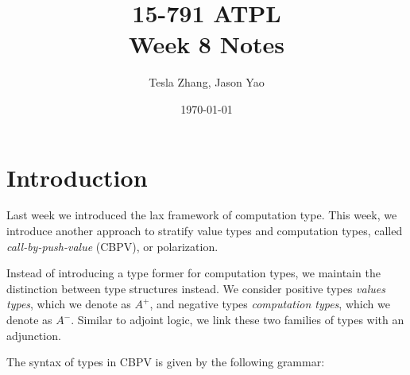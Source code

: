 \documentclass[letterpaper]{article}
\title{15-791 ATPL \\ Week 8 Notes}
\author{Tesla Zhang, Jason Yao}
\date{\today}
\begin{document}
\maketitle

\section{Introduction}
Last week we introduced the lax framework of computation type.
This week, we introduce another approach to stratify value types and computation types,
called \emph{call-by-push-value} (CBPV), or polarization.

Instead of introducing a type former for computation types,
we maintain the distinction between type structures instead.
We consider positive types \emph{values types}, which we denote as $A^+$,
and negative types \emph{computation types}, which we denote as $A^-$.
Similar to adjoint logic, we link these two families of types with an adjunction.

The syntax of types in CBPV is given by the following grammar:
\end{document}
